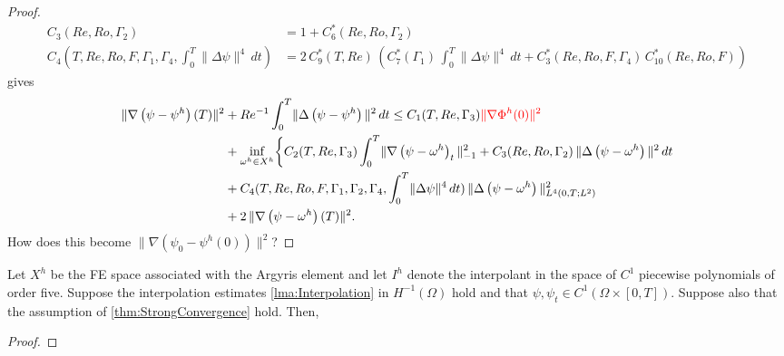 \begin{proof}
\begin{align*}
    C_3(Re,Ro,\Gamma_2) &= 1 + C^*_6(Re,Ro,\Gamma_2) \\
    C_4(T,Re,Ro,F,\Gamma_1,\Gamma_4,\int_{0}^{T}\!\|\Delta \psi\|^4\, dt) &=
      2\, C^*_9(T,Re)\,\left(C^*_7(\Gamma_1)\, \int_{0}^{T}\!\|\Delta \psi\|^4\,dt
      + C^*_3(Re,Ro,F,\Gamma_4)\, C^*_{10}(Re,Ro,F)\right)
  \end{align*}
  gives
  \begin{align*}
    \|\nabla \left( \psi - \psi^h\right)(T) \|^2
    &+ Re^{-1} \int_0^T\! \|\Delta \left(\psi - \psi^h\right)\|^2\, dt
      \le C_1(T,Re,\Gamma_3){\color{red} \|\nabla \Phi^h(0)\|^2} \\
      & + \inf_{\omega^h \in X^h} \biggl\{C_2(T,Re,\Gamma_3)
      \int_0^T\! \|\nabla \left( \psi - \omega^h\right)_t\|_{-1}^2
      + C_3(Re,Ro,\Gamma_2)\,\|\Delta \left(\psi - \omega^h\right)\|^2\, dt \\
      & + C_4(T,Re,Ro,F,\Gamma_1,\Gamma_2,\Gamma_4,\int_{0}^{T}\!\|\Delta
      \psi\|^4\, dt)\, \|\Delta \left(\psi - \omega^h\right)\|^2_{L^4(0,T;L^2)} \\
    & + 2\, \|\nabla \left(\psi - \omega^h\right)(T)\|^2.
  \end{align*}
  {\color{red} How does this become $\|\nabla\left(\psi_0 - \psi^h(0)\right)\|^2$?}
\end{proof}

\begin{lemma} \label{lma:Interpolation}

\end{lemma}

\begin{thm} \label{thm:SemiInterp}
  Let $X^h$ be the FE space associated with the Argyris element and let $I^h$
  denote the interpolant in the space of $C^1$ piecewise polynomials of order
  five. Suppose the interpolation estimates \autoref{lma:Interpolation}
  in $H^{-1}(\Omega)$ hold and that $\psi, \psi_t \in C^1(\Omega\times [0,T])$.
  Suppose also that the assumption of \autoref{thm:StrongConvergence} hold.
  Then,
\end{thm}
\begin{proof}

\end{proof}
